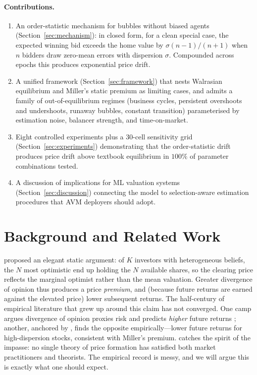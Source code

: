 \documentclass{article}
\begin{document}
\paragraph{Contributions.}
\begin{enumerate}[leftmargin=*,nosep]
\item An order-statistic mechanism for bubbles without biased
agents (Section~\ref{sec:mechanism}): in closed form, for a clean
special case, the expected winning bid exceeds the home value by
$\sigma(n-1)/(n+1)$ when $n$ bidders draw zero-mean errors with
dispersion $\sigma$. Compounded across epochs this produces
exponential price drift.
\item A unified framework (Section~\ref{sec:framework}) that nests
Walrasian equilibrium and Miller's static premium as limiting
cases, and admits a family of out-of-equilibrium regimes (business
cycles, persistent overshoots and undershoots, runaway bubbles,
constant transition) parameterised by estimation noise, balancer
strength, and time-on-market.
\item Eight controlled experiments plus a 30-cell sensitivity
grid (Section~\ref{sec:experiments}) demonstrating that the
order-statistic drift produces price drift above textbook
equilibrium in $100\%$ of parameter combinations tested.
\item A discussion of implications for ML valuation systems
(Section~\ref{sec:discussion}) connecting the model to
selection-aware estimation procedures that AVM deployers should
adopt.
\end{enumerate}

\section{Background and Related Work}
\label{sec:background}

\citet{miller1977} proposed an elegant static argument: of $K$
investors with heterogeneous beliefs, the $N$ most optimistic end
up holding the $N$ available shares, so the clearing price reflects
the marginal optimist rather than the mean valuation. Greater
divergence of opinion thus produces a price \emph{premium}, and
(because future returns are earned against the elevated price)
lower subsequent returns. The half-century of empirical literature
that grew up around this claim has not converged. One camp argues
divergence of opinion proxies risk and predicts \emph{higher}
future returns
\citep{williams1977,mayshar1983,varian1985,merton1987,epsteinwang1994,doukas2006};
another, anchored by \citet{dietherMalloyScherbina2002}, finds the
opposite empirically---lower future returns for high-dispersion
stocks, consistent with Miller's premium. \citet{moffitt2017}
catches the spirit of the impasse: no single theory of price
formation has satisfied both market practitioners and theorists.
The empirical record is messy, and we will argue this is exactly
what one should expect.
\end{document}
